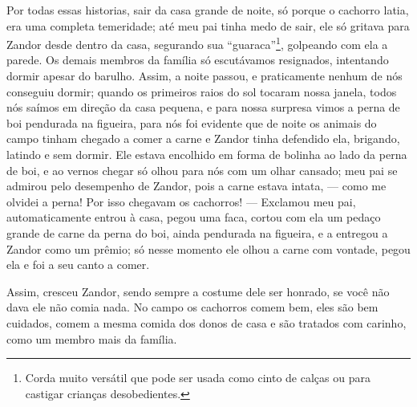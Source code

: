 Por todas essas historias, sair da casa grande de noite, só porque o cachorro latia, era uma completa temeridade; até meu pai tinha medo de sair, ele só gritava para Zandor desde dentro da casa, segurando sua ``guaraca''\footnote{Corda muito versátil que pode ser usada como cinto de calças ou para castigar crianças desobedientes.}, golpeando com ela a parede. 
Os demais membros da família só escutávamos resignados, intentando dormir apesar do barulho.
Assim, a noite passou, e praticamente nenhum de nós conseguiu dormir; quando os primeiros raios do sol tocaram nossa janela, todos nós saímos em direção da casa pequena, e para nossa surpresa vimos a perna de boi pendurada na figueira, para nós foi evidente que de noite os animais do campo tinham chegado a comer a carne e Zandor tinha defendido ela, brigando, latindo e sem dormir. 
Ele estava encolhido em forma de bolinha ao lado da perna de boi, e ao vernos chegar só olhou para nós com um olhar cansado; meu pai se admirou pelo desempenho de Zandor, pois a carne estava intata, --- como me olvidei a perna! Por isso chegavam os cachorros! --- 
Exclamou meu pai, automaticamente entrou à casa, pegou uma faca, cortou com ela um pedaço grande de carne da perna do boi, ainda pendurada na figueira, e a entregou a Zandor como um prêmio; só nesse momento ele olhou a carne com vontade, pegou ela e foi a seu canto a comer.

Assim, cresceu Zandor, sendo sempre a costume dele ser honrado, se você não dava ele não comia nada. 
No campo os cachorros comem bem, eles são bem cuidados, comem a mesma comida dos donos de casa e são tratados com carinho, como um membro mais da família.

